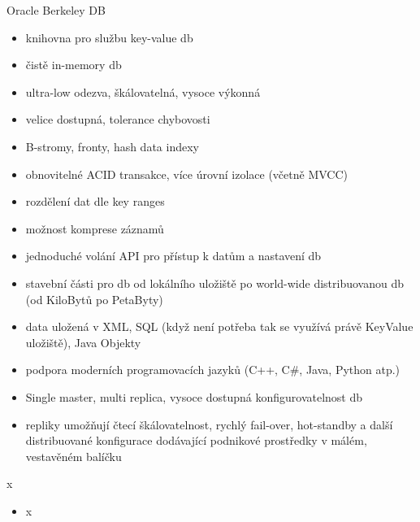 \documentclass{article}
\begin{document}
	\begin{subsubsection}{Oracle Berkeley DB}
		\begin{itemize}
			\item knihovna pro službu key-value db
			\item čistě in-memory db
			\item ultra-low odezva, škálovatelná, vysoce výkonná
			\item velice dostupná, tolerance chybovosti
			\item B-stromy, fronty, hash data indexy
			\item obnovitelné ACID transakce, více úrovní izolace (včetně MVCC)
			\item rozdělení dat dle key ranges
			\item možnost komprese záznamů
			\item jednoduché volání API pro přístup k datům a nastavení db
			\item stavební části pro  db od lokálního uložiště po world-wide distribuovanou db (od KiloBytů po PetaByty)
			\item data uložená v XML, SQL (když není potřeba tak se využívá právě KeyValue uložiště), Java Objekty
			\item podpora moderních programovacích jazyků (C++, C\#, Java, Python atp.)
			\item Single master, multi replica, vysoce dostupná konfigurovatelnost db
			\item repliky umožňují čtecí škálovatelnost, rychlý fail-over, hot-standby a další distribuované konfigurace dodávající podnikové prostředky v málém, vestavěném balíčku
		\end{itemize}
	\end{subsubsection}

		\begin{subsubsection}{x}
		\begin{itemize}
			\item x
		\end{itemize}
	\end{subsubsection}
\end{document}
